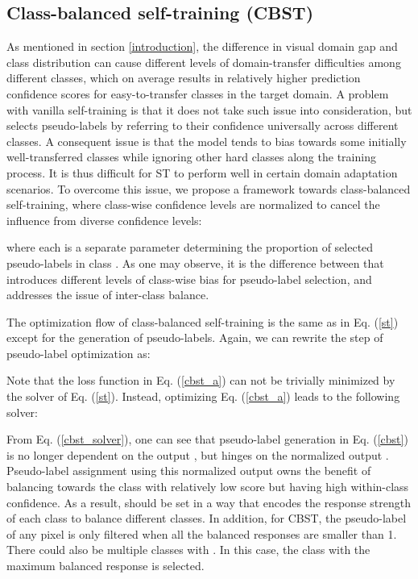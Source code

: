 \documentclass[runningheads]{llncs}
\begin{document}
\subsection{Class-balanced self-training (CBST)}
As mentioned in section \ref{introduction}, the difference in visual domain gap and class distribution can cause different levels of domain-transfer difficulties among different classes, which on average results in relatively higher prediction confidence scores for easy-to-transfer classes in the target domain. A problem with vanilla self-training is that it does not take such issue into consideration, but selects pseudo-labels by referring to their confidence universally across different classes. A consequent issue is that the model tends to bias towards some initially well-transferred classes while ignoring other hard classes along the training process. It is thus difficult for ST to perform well in certain domain adaptation scenarios. To overcome this issue, we propose a framework towards class-balanced self-training, where class-wise confidence levels are normalized to cancel the influence from diverse confidence levels:

where each  is a separate parameter determining the proportion of selected pseudo-labels in class . As one may observe, it is the difference between  that introduces different levels of class-wise bias for pseudo-label selection, and addresses the issue of inter-class balance.

The optimization flow of class-balanced self-training is the same as in Eq. (\ref{st}) except for the generation of pseudo-labels. Again, we can rewrite the step of pseudo-label optimization as:

Note that the loss function in Eq. (\ref{cbst_a}) can not be trivially minimized by the solver of Eq. (\ref{st}). Instead, optimizing Eq. (\ref{cbst_a}) leads to the following solver:

From Eq. (\ref{cbst_solver}), one can see that pseudo-label generation in Eq. (\ref{cbst}) is no longer dependent on the output , but hinges on the normalized output . Pseudo-label assignment using this normalized output owns the benefit of balancing towards the class with relatively low score but having high within-class confidence. As a result,  should be set in a way that  encodes the response strength of each class to balance different classes. In addition, for CBST, the pseudo-label of any pixel is only filtered when all the balanced responses are smaller than 1. There could also be multiple classes with . In this case, the class with the maximum balanced response is selected.
\end{document}
